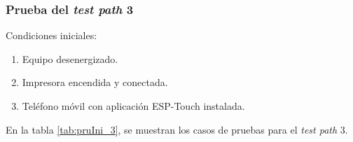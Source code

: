 \pagebreak
\subsubsection{Prueba del \textit{test path} 3}
\label{subsubsec:pruIni_3}

Condiciones iniciales: 

\begin{enumerate}
	\item Equipo desenergizado.
	\item Impresora encendida y conectada.
	\item Teléfono móvil con aplicación ESP-Touch instalada.
\end{enumerate}

En la tabla \ref{tab:pruIni_3}, se muestran los casos de pruebas para el \textit{test path} 3.

